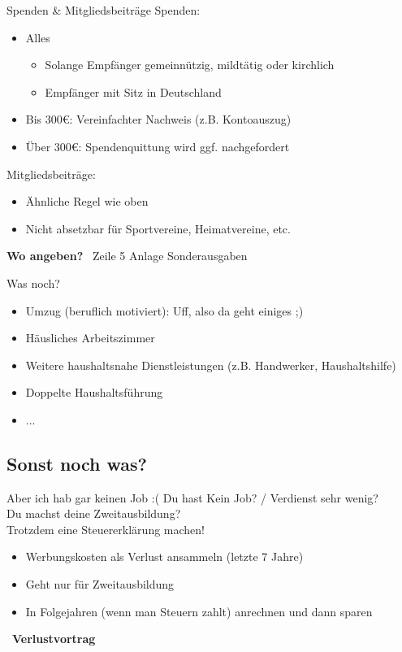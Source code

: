 \documentclass{beamer}
\begin{document}
			\begin{frame}{Spenden \& Mitgliedsbeiträge}
				Spenden:
				\begin{itemize}
					\item Alles
					\begin{itemize}
						\item Solange Empfänger gemeinnützig, mildtätig oder kirchlich
						\item Empfänger mit Sitz in Deutschland
					\end{itemize}
					\item Bis 300€: Vereinfachter Nachweis (z.B. Kontoauszug)
					\item Über 300€: Spendenquittung wird ggf. nachgefordert
				\end{itemize}\n\pause
				Mitgliedsbeiträge:
				\begin{itemize}
					\item Ähnliche Regel wie oben
					\item Nicht absetzbar für Sportvereine, Heimatvereine, etc.
				\end{itemize}\n\pause
				\textbf{Wo angeben?} \textrightarrow\ Zeile 5 Anlage Sonderausgaben
			\end{frame}
			
			\begin{frame}{Was noch?}
				\begin{itemize}
					\item Umzug (beruflich motiviert): Uff, also da geht einiges ;)
					\item Häusliches Arbeitszimmer
					\item Weitere haushaltsnahe Dienstleistungen (z.B. Handwerker, Haushaltshilfe)
					\item Doppelte Haushaltsführung
					\item ...
				\end{itemize}
			\end{frame}
			
		\subsection{Sonst noch was?}
		
			\begin{frame}{Aber ich hab gar keinen Job :(}
				Du hast Kein Job? / Verdienst sehr wenig?\\\pause
				Du machst deine Zweitausbildung?\\\pause
				Trotzdem eine Steuererklärung machen!\n\pause
				\begin{itemize}
					\item Werbungskosten als Verlust ansammeln (letzte 7 Jahre)
					\item Geht nur für Zweitausbildung
					\item In Folgejahren (wenn man Steuern zahlt) anrechnen und dann sparen
				\end{itemize}\n
				\textrightarrow\ \textbf{Verlustvortrag}
			\end{frame}
		
\end{document}
